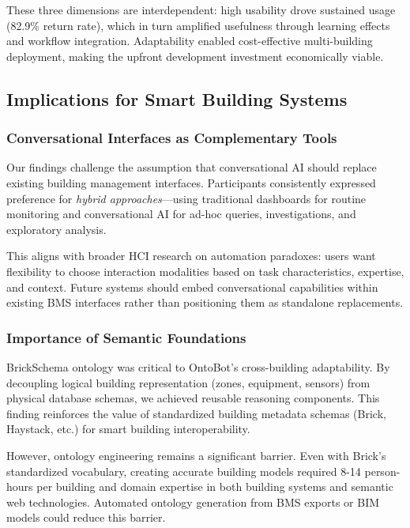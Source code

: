 \documentclass[acmlarge]{acmart}
\begin{document}
These three dimensions are interdependent: high usability drove sustained usage (82.9\% return rate), which in turn amplified usefulness through learning effects and workflow integration. Adaptability enabled cost-effective multi-building deployment, making the upfront development investment economically viable.

\subsection{Implications for Smart Building Systems}

\subsubsection{Conversational Interfaces as Complementary Tools}

Our findings challenge the assumption that conversational AI should replace existing building management interfaces. Participants consistently expressed preference for \textit{hybrid approaches}—using traditional dashboards for routine monitoring and conversational AI for ad-hoc queries, investigations, and exploratory analysis.

This aligns with broader HCI research on automation paradoxes: users want flexibility to choose interaction modalities based on task characteristics, expertise, and context. Future systems should embed conversational capabilities within existing BMS interfaces rather than positioning them as standalone replacements.

\subsubsection{Importance of Semantic Foundations}

BrickSchema ontology was critical to OntoBot's cross-building adaptability. By decoupling logical building representation (zones, equipment, sensors) from physical database schemas, we achieved reusable reasoning components. This finding reinforces the value of standardized building metadata schemas (Brick, Haystack, etc.) for smart building interoperability.

However, ontology engineering remains a significant barrier. Even with Brick's standardized vocabulary, creating accurate building models required 8-14 person-hours per building and domain expertise in both building systems and semantic web technologies. Automated ontology generation from BMS exports or BIM models could reduce this barrier.
\end{document}
